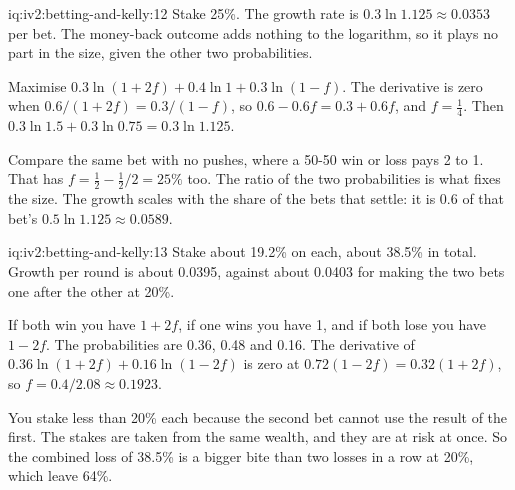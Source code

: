 \begin{solution}{iq:iv2:betting-and-kelly:12}
Stake 25\%. The growth rate is $0.3\ln 1.125 \approx 0.0353$ per bet. The money-back outcome adds nothing to the logarithm, so it plays no part in the size, given the other two probabilities.

Maximise $0.3\ln(1 + 2f) + 0.4\ln 1 + 0.3\ln(1 - f)$. The derivative is zero when $0.6/(1 + 2f) = 0.3/(1 - f)$, so $0.6 - 0.6f = 0.3 + 0.6f$, and $f = \tfrac14$. Then $0.3\ln 1.5 + 0.3\ln 0.75 = 0.3\ln 1.125$.

Compare the same bet with no pushes, where a 50-50 win or loss pays 2 to 1. That has $f = \tfrac12 - \tfrac12/2 = 25\%$ too. The ratio of the two probabilities is what fixes the size. The growth scales with the share of the bets that settle: it is $0.6$ of that bet's $0.5\ln 1.125 \approx 0.0589$.

\end{solution}

\begin{solution}{iq:iv2:betting-and-kelly:13}
Stake about 19.2\% on each, about 38.5\% in total. Growth per round is about 0.0395, against about 0.0403 for making the two bets one after the other at 20\%.

If both win you have $1 + 2f$, if one wins you have 1, and if both lose you have $1 - 2f$. The probabilities are 0.36, 0.48 and 0.16. The derivative of $0.36\ln(1 + 2f) + 0.16\ln(1 - 2f)$ is zero at $0.72(1 - 2f) = 0.32(1 + 2f)$, so $f = 0.4/2.08 \approx 0.1923$.

You stake less than 20\% each because the second bet cannot use the result of the first. The stakes are taken from the same wealth, and they are at risk at once. So the combined loss of 38.5\% is a bigger bite than two losses in a row at 20\%, which leave 64\%.

\end{solution}

